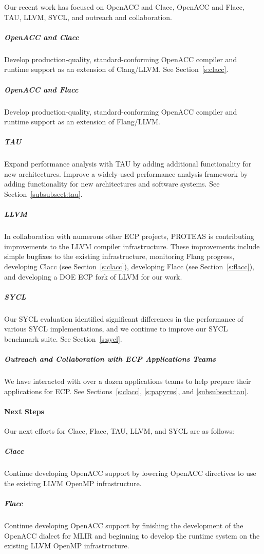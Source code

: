 Our recent work has focused on OpenACC and Clacc, OpenACC and Flacc, TAU, LLVM, SYCL, and outreach and collaboration.

\subparagraph{OpenACC and Clacc~\cite{clacc:2018:denny}}
Develop production-quality, standard-conforming OpenACC compiler and runtime support as an extension of Clang/LLVM. See Section~\ref{s:clacc}.
    
\subparagraph{OpenACC and Flacc}
Develop production-quality, standard-conforming OpenACC compiler and runtime support as an extension of Flang/LLVM. 

\subparagraph{TAU}
Expand performance analysis with TAU by adding additional functionality for new architectures. 
Improve a widely-used performance analysis framework by adding functionality for new architectures and software systems.
See Section~\ref{subsubsect:tau}.

\subparagraph{LLVM}
In collaboration with numerous other ECP projects, PROTEAS is contributing improvements to the LLVM compiler infrastructure. These improvements include simple bugfixes to the existing infrastructure, monitoring Flang progress, developing Clacc (see Section~\ref{s:clacc}), developing Flacc (see Section~\ref{s:flacc}), and developing a DOE ECP fork of LLVM for our work.
    
\subparagraph{SYCL} 
Our SYCL evaluation identified significant differences in the performance of various SYCL implementations, and we continue to improve our SYCL benchmark suite. See Section~\ref{s:sycl}.

\subparagraph{Outreach and Collaboration with ECP Applications Teams} 
We have interacted with over a dozen applications teams to help prepare their applications for ECP. See Sections~\ref{s:clacc}, \ref{s:papyrus}, and \ref{subsubsect:tau}.
    

\paragraph{Next Steps}

Our next efforts for Clacc, Flacc, TAU, LLVM, and SYCL are as follows:

	\subparagraph{Clacc} Continue developing OpenACC support by lowering OpenACC directives to use the existing LLVM OpenMP infrastructure.
    
    \subparagraph{Flacc} Continue developing OpenACC support by finishing the development of the  OpenACC dialect for MLIR and beginning to develop the runtime system on the existing LLVM OpenMP infrastructure.
    
